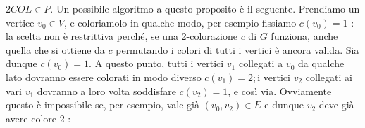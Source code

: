\begin{enumerate}
          $2 C O L \in P$. Un possibile algoritmo a questo proposito è il seguente.
          Prendiamo un vertice $v_0 \in V$, e coloriamolo in qualche modo, per esempio
          fissiamo $c\left(v_0\right)=1$ : la scelta non è restrittiva perché, se una
          2-colorazione $c$ di $G$ funziona, anche quella che si ottiene da $c$ permutando
          i colori di tutti i vertici è ancora valida. Sia dunque $c\left(v_0\right)=1$. A
          questo punto, tutti i vertici $v_1$ collegati a $v_0$ da qualche lato dovranno
          essere colorati in modo diverso $c\left(v_1\right)=2 ; \mathrm{i}$ vertici $v_2$
          collegati ai vari $v_1$ dovranno a loro volta soddisfare $c\left(v_2\right)=1$,
          e così via. Ovviamente questo è impossibile se, per esempio, vale già
          $\left(v_0, v_2\right) \in E$ e dunque $v_2$ deve già avere colore
          2 :

          \begin{center}
\end{center}
\end{enumerate}
